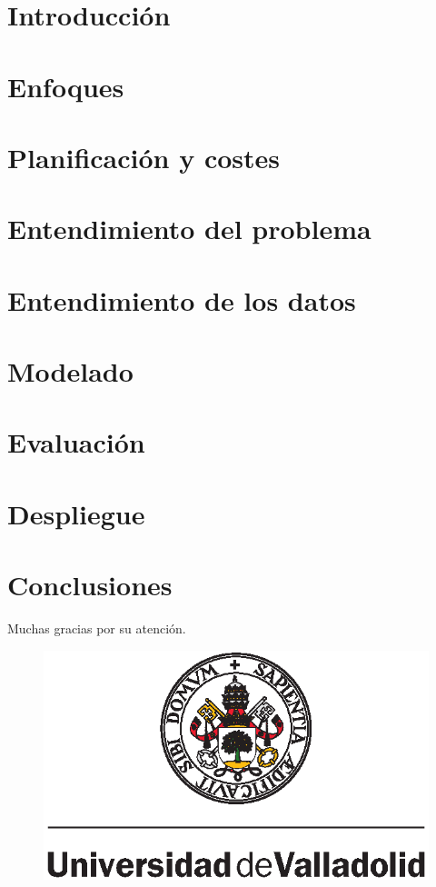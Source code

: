\documentclass[xcolor=dvipsnames]{beamer}
\begin{document}
\AtBeginSection{\frame{\sectionpage}}




\section{Introducción}



\section{Enfoques}


\section{Planificación y costes}


\section{Entendimiento del problema}


\section{Entendimiento de los datos}


\section{Modelado}


\section{Evaluación}


\section{Despliegue}


\section{Conclusiones}


\begin{frame}
\begin{center}
        {\Huge Muchas gracias por su atención.}
    \end{center}
    \begin{figure}[H]
        \begin{center}
            \includegraphics[width=0.25\linewidth]{img/uva.eps}
        \end{center}
    \end{figure}

\end{frame}
\end{document}
